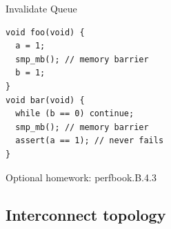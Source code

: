 \begin{frame}{Invalidate Queue}


\begin{verbatim}
void foo(void) {
  a = 1;
  smp_mb(); // memory barrier
  b = 1;
}
void bar(void) {
  while (b == 0) continue;
  smp_mb(); // memory barrier
  assert(a == 1); // never fails
}
\end{verbatim}

Optional homework: perfbook.B.4.3

\end{frame}

\subsection{Interconnect topology}
\showTOCSub

